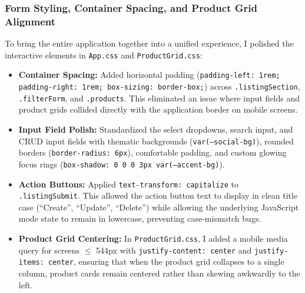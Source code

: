 \documentclass{article}[12pt]
\begin{document}
\subsubsection{Form Styling, Container Spacing, and Product Grid Alignment}
To bring the entire application together into a unified experience, I polished the interactive elements in \texttt{App.css} and \texttt{ProductGrid.css}:
\begin{itemize}
    \item \textbf{Container Spacing:} Added horizontal padding (\texttt{padding-left: 1rem; padding-right: 1rem; box-sizing: border-box;}) across \texttt{.listingSection},
    \texttt{.filterForm}, and \texttt{.products}. This eliminated an issue where input fields and product grids collided directly with the application border on mobile screens.
    
    \item \textbf{Input Field Polish:} Standardized the select dropdowns, search input, and CRUD input fields with thematic backgrounds (\texttt{var(--social-bg)}), 
    rounded borders (\texttt{border-radius: 6px}), comfortable padding, and custom glowing focus rings (\texttt{box-shadow: 0 0 0 3px var(--accent-bg)}).

    \item \textbf{Action Buttons:} Applied \texttt{text-transform: capitalize} to \texttt{.listingSubmit}. This allowed the action button text to display in clean
    title case (``Create'', ``Update'', ``Delete'') while allowing the underlying JavaScript mode state to remain in lowercase, preventing case-mismatch bugs.
    
    \item \textbf{Product Grid Centering:} In \texttt{ProductGrid.css}, I added a mobile media query for screens $\le$ 544px with \texttt{justify-content: center} and 
    \texttt{justify-items: center}, ensuring that when the product grid collapses to a single column, product cards remain centered rather than skewing awkwardly to the left.
\end{itemize}
\end{document}

